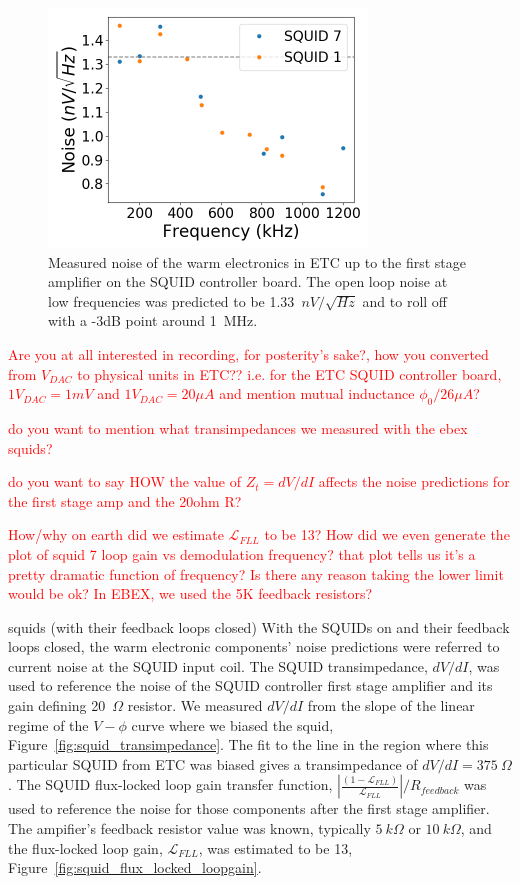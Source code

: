 \begin{figure}[ht!]
\begin{center}
\includegraphics[height=2.5in]{figures/warm_electronic_noise.png}
\caption{Measured noise of the warm electronics in \ac{ETC} up to the first stage amplifier on the \ac{SQUID} controller board. The open loop noise at low frequencies was predicted to be 1.33~$nV/\sqrt{Hz}$ and to roll off with a -3dB point around 1~MHz. 
\label{fig:dark_electronic_noise} }
\end{center}
\end{figure}


\textcolor{red}{Are you at all interested in recording, for posterity's sake?, how you converted from $V_{DAC}$ to physical units in \ac{ETC}?? i.e. for the \ac{ETC} \ac{SQUID} controller board, $1 V_{DAC} = 1 mV$ and $1 V_{DAC} = 20 \mu A$ and mention mutual inductance $\phi_{0}/26 \mu A$?}

\textcolor{red}{do you want to mention what transimpedances we measured with the ebex squids?}

\textcolor{red}{ do you want to say HOW the value of $Z_{t} = dV/dI$ affects the noise predictions for the first stage amp and the 20ohm R?}

\textcolor{red}{How/why on earth did we estimate $\mathscr{L}_{FLL}$ to be 13? How did we even generate the plot of squid 7 loop gain vs demodulation frequency? that plot tells us it's a pretty dramatic function of frequency? Is there any reason taking the lower limit would be ok? In EBEX, we used the 5K feedback resistors?}

squids (with their feedback loops closed)
With the \ac{SQUID}s on and their feedback loops closed, the warm electronic components' noise predictions were referred to current noise at the \ac{SQUID} input coil.
The \ac{SQUID} transimpedance, $dV/dI$, was used to reference the noise of the \ac{SQUID} controller first stage amplifier and its gain defining 20~$\Omega$ resistor. 
We measured $dV/dI$ from the slope of the linear regime of the $V-\phi$ curve where we biased the squid, Figure~\ref{fig:squid_transimpedance}. 
The fit to the line in the region where this particular \ac{SQUID} from \ac{ETC} was biased gives a transimpedance of $dV/dI=375~\Omega$. 
The \ac{SQUID} flux-locked loop gain transfer function, $|\frac{(1-\mathscr{L}_{FLL})}{\mathscr{L}_{FLL}}|/R_{feedback}$ was used to reference the noise for those components after the first stage amplifier. 
The ampifier's feedback resistor value was known, typically $5~k\Omega$ or $10~k\Omega$, and the flux-locked loop gain, $\mathscr{L}_{FLL}$, was estimated to be 13, Figure~\ref{fig:squid_flux_locked_loopgain}. 

